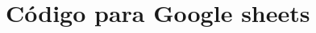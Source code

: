 \chapter{Código para Google sheets}
\label{Código para Google sheets}


\vspace{0.7cm}

\vspace{0.7cm}

